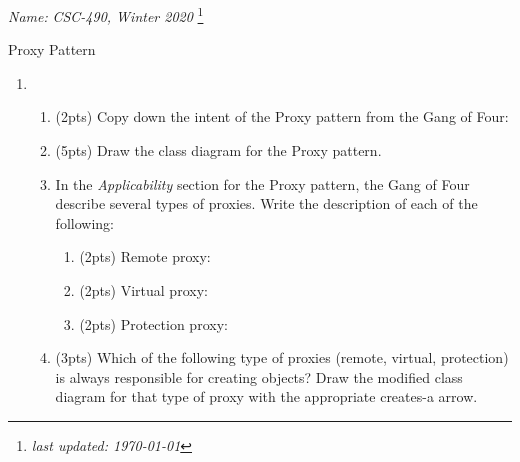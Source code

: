 \documentclass[11pt]{article}
\newlength{\up}\setlength{\up}{-\baselineskip}
\newcommand\blfootnote[1]{%
  \begingroup
  \renewcommand\thefootnote{}\footnote{#1}%
  \addtocounter{footnote}{-1}%
  \endgroup
}
\begin{document}
\noindent\emph{Name:}
\hfill
\emph{CSC-490, Winter 2020}
\blfootnote{\emph{last updated: \today}}

\vspace{-0.4in}

\begin{center}
  {\huge Proxy Pattern}
\end{center}

\medskip




\begin{enumerate}

  \item
  \begin{enumerate}

    \item (2pts) Copy down the intent of the Proxy pattern from the Gang of Four:

    \vspace{0.5in}

    \item (5pts) Draw the class diagram for the Proxy pattern. 

    \vfill
    \vfill
    \vfill

    \item In the \emph{Applicability} section for the Proxy pattern, the Gang of Four describe several types of proxies. Write the description of each of the following:

    \begin{enumerate}

      \item (2pts) Remote proxy:

      \bigskip
      \bigskip

      \item (2pts) Virtual proxy:

      \bigskip
      \bigskip

      \item (2pts) Protection proxy:

      \bigskip
      \bigskip

    \end{enumerate}

    \item (3pts) Which of the following type of proxies (remote, virtual, protection) is always responsible for creating objects? Draw the modified class diagram for that type of proxy with the appropriate creates-a arrow.


\end{enumerate}
\end{enumerate}
\end{document}
